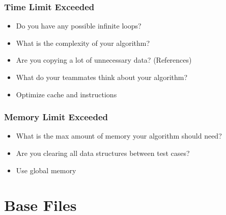 \subsubsection{Time Limit Exceeded}
\begin{itemize}
	\item Do you have any possible infinite loops?
	\item What is the complexity of your algorithm?
	\item Are you copying a lot of unnecessary data? (References)
	\item What do your teammates think about your algorithm?
	\item Optimize cache and instructions
\end{itemize}

\subsubsection{Memory Limit Exceeded}
\begin{itemize}
	\item What is the max amount of memory your algorithm should need?
	\item Are you clearing all data structures between test cases?
	\item Use global memory
\end{itemize}

\section{Base Files}
